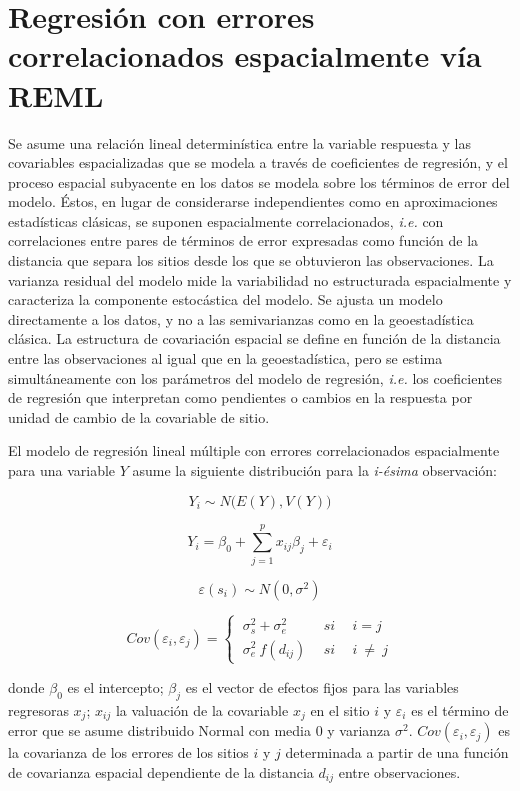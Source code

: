 \documentclass[11pt,b5paper,]{krantz}
\begin{document}
\section{Regresión con errores correlacionados espacialmente vía
REML}\label{regresiuxf3n-con-errores-correlacionados-espacialmente-vuxeda-reml}

Se asume una relación lineal determinística entre la variable respuesta
y las covariables espacializadas que se modela a través de coeficientes
de regresión, y el proceso espacial subyacente en los datos se modela
sobre los términos de error del modelo. Éstos, en lugar de considerarse
independientes como en aproximaciones estadísticas clásicas, se suponen
espacialmente correlacionados, \emph{i.e.} con correlaciones entre pares
de términos de error expresadas como función de la distancia que separa
los sitios desde los que se obtuvieron las observaciones. La varianza
residual del modelo mide la variabilidad no estructurada espacialmente y
caracteriza la componente estocástica del modelo. Se ajusta un modelo
directamente a los datos, y no a las semivarianzas como en la
geoestadística clásica. La estructura de covariación espacial se define
en función de la distancia entre las observaciones al igual que en la
geoestadística, pero se estima simultáneamente con los parámetros del
modelo de regresión, \emph{i.e.} los coeficientes de regresión que
interpretan como pendientes o cambios en la respuesta por unidad de
cambio de la covariable de sitio.

El modelo de regresión lineal múltiple con errores correlacionados
espacialmente para una variable \(Y\) asume la siguiente distribución
para la \emph{i-ésima} observación:

\[Y_i\sim N \big(E(Y),V(Y) \big)\]

\[Y_i=\beta_0+\sum_{j=1}^{p}{x_{ij}\beta_j}+\varepsilon_i\]

\[\varepsilon(s_i)\sim N(0,\sigma^2)\]

\[Cov(\varepsilon_i,\varepsilon_j)=\left\{\ \begin{array}{lcc}
\sigma_s^2+\sigma_e^2\ &\ si\ &\ i=j
\\\sigma_e^2\ f(d_{ij})\ &\ si\ &\ i\ \neq\ j
\end{array}
\right.\]

donde \(\beta_0\) es el intercepto; \(\beta_j\) es el vector de efectos
fijos para las variables regresoras \(x_j\); \(x_{ij}\) la valuación de
la covariable \(x_j\) en el sitio \(i\) y \(\varepsilon_i\) es el
término de error que se asume distribuido Normal con media 0 y varianza
\(\sigma^2\). \(Cov(\varepsilon_i,\varepsilon_j)\) es la covarianza de
los errores de los sitios \(i\) y \(j\) determinada a partir de una
función de covarianza espacial dependiente de la distancia \(d_{ij}\)
entre observaciones.
\end{document}
